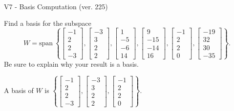 \begin{exercise}
  \begin{exerciseTitle}V7 - Basis Computation (ver. 225)\end{exerciseTitle}
  \begin{exerciseStatement}
    Find a basis for the subspace 
\[W=\mathrm{span}\ \left\{\left[\begin{array}{r}
-1 \\
2 \\
2 \\
-3
\end{array}\right] , \left[\begin{array}{r}
-3 \\
3 \\
2 \\
2
\end{array}\right] , \left[\begin{array}{r}
1 \\
-5 \\
-6 \\
14
\end{array}\right] , \left[\begin{array}{r}
9 \\
-15 \\
-14 \\
16
\end{array}\right] , \left[\begin{array}{r}
-1 \\
2 \\
2 \\
0
\end{array}\right] , \left[\begin{array}{r}
-19 \\
32 \\
30 \\
-35
\end{array}\right]\right\}.\]
 Be sure to explain why your result is a basis.


  \end{exerciseStatement}
  \begin{exerciseAnswer}
   A basis of \(W\) is  \(\left\{\left[\begin{array}{r}
-1 \\
2 \\
2 \\
-3
\end{array}\right] , \left[\begin{array}{r}
-3 \\
3 \\
2 \\
2
\end{array}\right] , \left[\begin{array}{r}
-1 \\
2 \\
2 \\
0
\end{array}\right]\right\}\).
  


  \end{exerciseAnswer}
\end{exercise}
